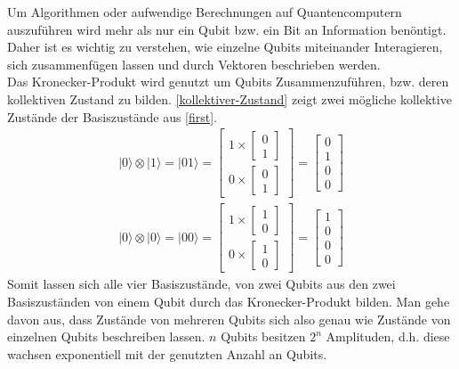 Um Algorithmen oder aufwendige Berechnungen auf Quantencomputern auszuf\"uhren wird mehr als nur ein Qubit bzw. ein Bit an Information ben\"ontigt. Daher ist es wichtig zu verstehen, wie einzelne Qubits miteinander Interagieren, sich zusammenf\"ugen lassen und durch Vektoren beschrieben werden. \\

Das Kronecker-Produkt wird genutzt um Qubits Zusammenzuf\"uhren, bzw. deren kollektiven Zustand zu bilden. \ref{kollektiver-Zustand} zeigt zwei m\"ogliche kollektive Zust\"ande der Basiszust\"ande aus \ref{first}.
\begin{equation}\label{kollektiver-Zustand}
\begin{aligned}
  |0\rangle\otimes |1\rangle = |01\rangle = \begin{bmatrix}1 \times \begin{bmatrix} 0\\1\end{bmatrix}\\[1em] 0 \times \begin{bmatrix} 0\\1\end{bmatrix}\end{bmatrix} = \begin{bmatrix} 0 \\ 1 \\ 0 \\ 0\end{bmatrix} \\[1em]
  |0\rangle\otimes |0\rangle = |00\rangle = \begin{bmatrix}1 \times \begin{bmatrix} 1\\0\end{bmatrix}\\[1em] 0 \times \begin{bmatrix} 1\\0\end{bmatrix}\end{bmatrix} = \begin{bmatrix} 1 \\ 0 \\ 0 \\ 0\end{bmatrix}
\end{aligned}
\end{equation}
Somit lassen sich alle vier Basiszust\"ande, von zwei Qubits aus den zwei Basiszust\"anden von einem Qubit durch das Kronecker-Produkt bilden.
Man gehe davon aus, dass Zust\"ande von mehreren Qubits sich also genau wie Zust\"ande von einzelnen Qubits beschreiben lassen. $n$ Qubits besitzen $2^n$ Amplituden, d.h. diese wachsen exponentiell mit der genutzten Anzahl an Qubits.
